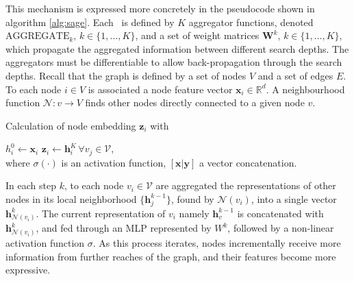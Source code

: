 This mechanism is expressed more concretely in the pseudocode shown in algorithm \ref{alg:sage}. 
Each \graphsage~is defined by $K$ aggregator functions, denoted $\text{AGGREGATE}_k,\,k\in\{1,\dotsc,K\}$, and a set of weight matrices $\mathbf{W}^k,\,k\in\{1,\dotsc,K\}$, which propagate the aggregated information between different search depths.
The aggregators must be differentiable to allow back-propagation through the search depths.
Recall that the graph is defined by a set of nodes $V$ and a set of edges $E$. 
To each node $i\in V$ is associated a node feature vector $\mathbf{x}_i\in\mathbb{R}^{d}$. 
A neighbourhood function $\mathcal{N}: v\rightarrow {V}$ finds other nodes directly connected to a given node $v$.
\begin{algorithm}
\caption{Calculation of node embedding $\mathbf{z}_i$ with \graphsage~\cite{graphsage} }\label{alg:sage}
$h^0_{i} \gets \mathbf{x}_i$\;
$\mathbf{z}_i \gets \mathbf{h}_i^K \, \forall v_j \in \mathcal{V},$\\
where $\sigma(\cdot)$ is an activation function, $[\mathbf{x} | \mathbf{y}]$ a vector concatenation.
\end{algorithm}
In each step $k$, to each node $v_i \in \mathcal{V}$ are aggregated the representations of other nodes in its local neighborhood $\{ \mathbf{h}_j^{k-1} \}$, found by $\mathcal{N}(v_i)$, into a single vector $\mathbf{h}^k_{\mathcal{N}(v_i)}$. 
The current representation of $v_i$ namely $\mathbf{h}_v^{k-1}$ is concatenated with $\mathbf{h}^k_{\mathcal{N}(v_i)}$, and fed through an MLP represented by $W^k$, followed by a non-linear activation function $\sigma$.
As this process iterates, nodes incrementally receive more information from further reaches of the graph, and their features become more expressive.


